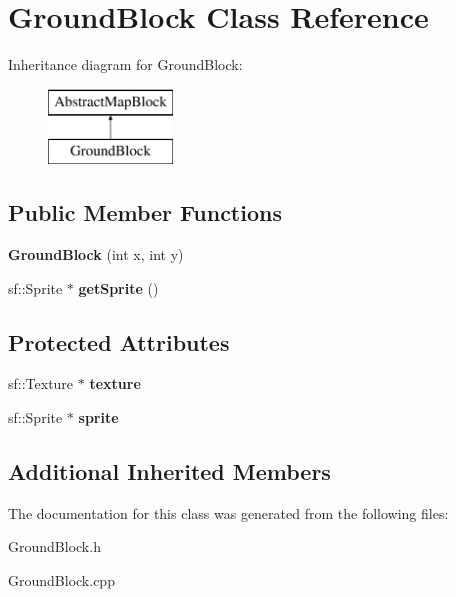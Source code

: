 \hypertarget{class_ground_block}{}\section{Ground\+Block Class Reference}
\label{class_ground_block}
Inheritance diagram for Ground\+Block\+:\begin{figure}[H]
\begin{center}
\leavevmode
\includegraphics[height=2.000000cm]{class_ground_block}
\end{center}
\end{figure}
\subsection*{Public Member Functions}
\begin{DoxyCompactItemize}
\item 
\mbox{\label{class_ground_block_a0155a6938214c2752002828b9e26da0a}} 
{\bfseries Ground\+Block} (int x, int y)
\item 
\mbox{\label{class_ground_block_a73c0f8ff59ef53b18f03bc3f22f8f810}} 
sf\+::\+Sprite $\ast$ {\bfseries get\+Sprite} ()
\end{DoxyCompactItemize}
\subsection*{Protected Attributes}
\begin{DoxyCompactItemize}
\item 
\mbox{\label{class_ground_block_af610cda7ad96e934524a7bbdc13a64d6}} 
sf\+::\+Texture $\ast$ {\bfseries texture}
\item 
\mbox{\label{class_ground_block_a235135fde9ffb53700b4bee134175dda}} 
sf\+::\+Sprite $\ast$ {\bfseries sprite}
\end{DoxyCompactItemize}
\subsection*{Additional Inherited Members}


The documentation for this class was generated from the following files\+:\begin{DoxyCompactItemize}
\item 
Ground\+Block.\+h\item 
Ground\+Block.\+cpp\end{DoxyCompactItemize}
